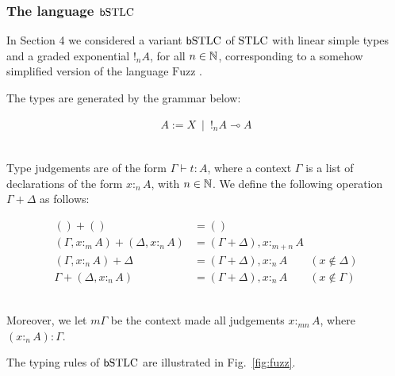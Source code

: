 
\subsubsection{The language $\mathsf b\mathrm{STLC}$}
In Section 4 we considered a variant $\mathsf b\mathrm{STLC}$ of $\mathrm{STLC}$ with linear simple types and a graded exponential $!_{n}A$, for all $n\in \mathbb{N}$, corresponding to a somehow simplified version of the language $\mathrm{Fuzz}$ \cite{Reed2010}. 
%


The types are generated by the grammar below:


{
\begin{minipage}{\textwidth}
\begin{align*}
A:= X \ \mid  \ !_{n}A \multimap A
\end{align*}\end{minipage}}\medskip\\
Type judgements are of the form $\Gamma \vdash t:A$, where a context $\Gamma$ is a list of declarations of the form $x :_{n}A$, with $n\in \mathbb{N}$.
We define the following operation $\Gamma+\Delta$  as follows:

{
\begin{minipage}{\textwidth}
\begin{align*}
() + () & =() \\
(\Gamma, x:_{m} A)+( \Delta, x:_{n} A) & =  (\Gamma+\Delta), x:_{m+n}A \\
(\Gamma, x:_{n}A)+\Delta & =(\Gamma+\Delta), x:_{n}A \qquad (x\notin \Delta) \\
\Gamma+ (\Delta, x:_{n}A) &= (\Gamma+\Delta), x:_{n} A \qquad (x\notin \Gamma)
\end{align*}\end{minipage}}\medskip\\
Moreover, we let $m\Gamma$ be the context made all judgements $x:_{mn}A$, where $(x:_{n}A): \Gamma$.  

The typing rules of $\mathsf b\mathrm{STLC}$ are illustrated in Fig.~\ref{fig:fuzz}.

